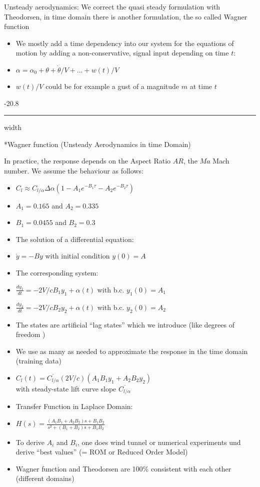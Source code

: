 \documentclass[8pt, landscape, fleqn]{scrartcl}
\makeatletter
\renewcommand{\subsubsection}{\@startsection{subsubsection}{1}{0mm}%
{-2\baselineskip}{0.8\baselineskip}%
{\hrule depth 0.2pt width\columnwidth\vspace*{1.2em}\normalsize\bfseries\rmfamily}}
\makeatother
\begin{document}
\begin{multicols*}{3}
 Unsteady aerodynamics: We correct the quasi steady formulation with Theodorsen, in time domain there is another formulation, the so called Wagner function

 \begin{itemize}
     \item We mostly add a time dependency into our system for the equations of motion by adding a non-conservative, signal input depending on time $t$:
     \item $\alpha = \alpha_0 + \theta + \dot{\theta}/V + ... + w(t)/V$
     \item $w(t)/V$ could be for example a gust of a magnitude $m$ at time $t$
 \end{itemize}

 \subsubsection*{Wagner function (Unsteady Aerodynamics in time Domain)}

 In practice, the response depends on the Aspect Ratio $AR$, the $Ma$ Mach number. We assume the behaviour as follows:

 \begin{itemize}
     \item $C_l \approx C_{l/\alpha} \Delta \alpha (1- A_1 e^{-B_1 \tau} - A_2 e^{-B_2 \tau})$
     \item $A_1 = 0.165$ and $A_2 = 0.335$ 
     \item $B_1 = 0.0455$ and $B_2 = 0.3$
     \item The solution of a differential equation:
     \item $\dot{y} = -B y$ with initial condition $y(0) = A$
     \item The corresponding system:
     \item $\frac{dy_1}{dt} = -2V/c B_1 y_1+\alpha(t)$ with b.c. $y_1(0) = A_1$
     \item $\frac{dy_2}{dt} = -2V/c B_2 y_2+\alpha(t)$ with b.c. $y_2(0) = A_2$
     \item The states are artificial ``lag states'' which we introduce (like degrees of freedom )
     \item We use as many as needed to approximate the response in the time domain (training data)
     \item $C_l(t) = \overline{C_{l/\alpha}} (2V/c)(A_1B_1y_1 + A_2B_2y_2)$ \\ with steady-state lift curve slope $\overline{C_{l/\alpha}}$
     \item Transfer Function in Laplace Domain:
     \item $H(s) = \frac{(A_1B_1+A_2B_2)s + B_1B_2}{s^2+(B_1+B_2)s + B_1B_2}$
     \item To derive $A_i$ and $B_i$, one does wind tunnel or numerical experiments und derive ``best values'' (= ROM or Reduced Order Model)
     \item Wagner function and Theodorsen are 100\% consistent with each other (different domains)
 \end{itemize}


\end{multicols*}
\end{document}
